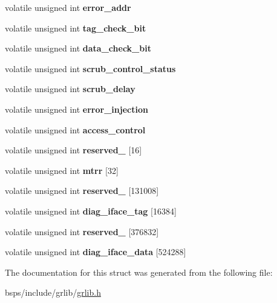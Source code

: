 \begin{DoxyCompactItemize}
\item 
\mbox{\label{structl2c__regs_a203bbdf9b78130e31251e3b1e5f3c41b}} 
volatile unsigned int {\bfseries error\+\_\+addr}
\item 
\mbox{\label{structl2c__regs_a0b7bad1e780db2d5e9c8f2e6f7ba40c4}} 
volatile unsigned int {\bfseries tag\+\_\+check\+\_\+bit}
\item 
\mbox{\label{structl2c__regs_aad014d075c4afee2c6c687008a390c1e}} 
volatile unsigned int {\bfseries data\+\_\+check\+\_\+bit}
\item 
\mbox{\label{structl2c__regs_abf071de340199ab4a000e59cbaa31d5f}} 
volatile unsigned int {\bfseries scrub\+\_\+control\+\_\+status}
\item 
\mbox{\label{structl2c__regs_ab616dc151379565e4661ac96d4c08ca3}} 
volatile unsigned int {\bfseries scrub\+\_\+delay}
\item 
\mbox{\label{structl2c__regs_a6ec76ba363d79277795644764a475026}} 
volatile unsigned int {\bfseries error\+\_\+injection}
\item 
\mbox{\label{structl2c__regs_afa8a6ff7e530cf438ca481dd68339179}} 
volatile unsigned int {\bfseries access\+\_\+control}
\item 
\mbox{\label{structl2c__regs_aa76e3c614ba82aa16d2f452c869e4881}} 
volatile unsigned int {\bfseries reserved\+\_} \mbox{[}16\mbox{]}
\item 
\mbox{\label{structl2c__regs_ab2358c876ec7a14f478e25092d068d71}} 
volatile unsigned int {\bfseries mtrr} \mbox{[}32\mbox{]}
\item 
\mbox{\label{structl2c__regs_a19221c105c7aadcdc60cf18cdad5d860}} 
volatile unsigned int {\bfseries reserved\+\_} \mbox{[}131008\mbox{]}
\item 
\mbox{\label{structl2c__regs_a7385f954c86f14cedf72d9dc2eea2e3a}} 
volatile unsigned int {\bfseries diag\+\_\+iface\+\_\+tag} \mbox{[}16384\mbox{]}
\item 
\mbox{\label{structl2c__regs_a8205b272cddb7caf90a36a3f9b61c845}} 
volatile unsigned int {\bfseries reserved\+\_} \mbox{[}376832\mbox{]}
\item 
\mbox{\label{structl2c__regs_a5f75171ce5afbe0ea3cdc172967b2dd9}} 
volatile unsigned int {\bfseries diag\+\_\+iface\+\_\+data} \mbox{[}524288\mbox{]}
\end{DoxyCompactItemize}


The documentation for this struct was generated from the following file\+:\begin{DoxyCompactItemize}
\item 
bsps/include/grlib/\mbox{\hyperlink{grlib_8h}{grlib.\+h}}\end{DoxyCompactItemize}
